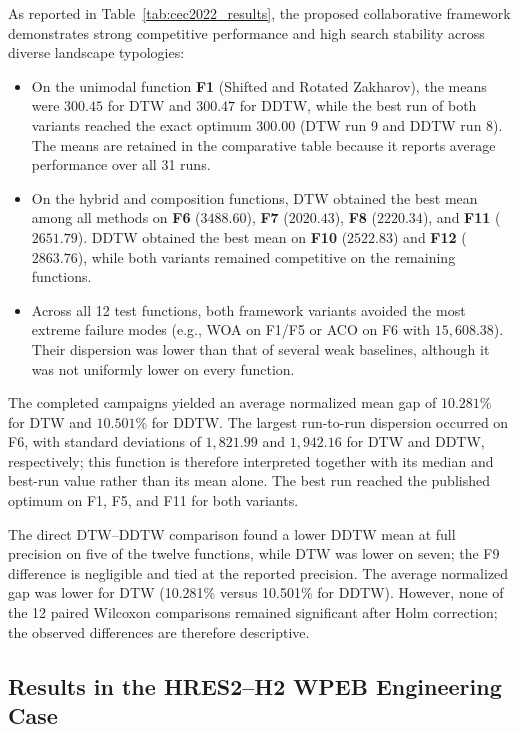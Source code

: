 As reported in Table~\ref{tab:cec2022_results}, the proposed collaborative framework demonstrates strong competitive performance and high search stability across diverse landscape typologies:
\begin{itemize}
    \item On the unimodal function \textbf{F1} (Shifted and Rotated Zakharov), the means were $300.45$ for DTW and $300.47$ for DDTW, while the best run of both variants reached the exact optimum $300.00$ (DTW run 9 and DDTW run 8). The means are retained in the comparative table because it reports average performance over all 31 runs.
    \item On the hybrid and composition functions, DTW obtained the best mean among all methods on \textbf{F6} ($3488.60$), \textbf{F7} ($2020.43$), \textbf{F8} ($2220.34$), and \textbf{F11} ($2651.79$). DDTW obtained the best mean on \textbf{F10} ($2522.83$) and \textbf{F12} ($2863.76$), while both variants remained competitive on the remaining functions.
    \item Across all 12 test functions, both framework variants avoided the most extreme failure modes (e.g., WOA on F1/F5 or ACO on F6 with $15{,}608.38$). Their dispersion was lower than that of several weak baselines, although it was not uniformly lower on every function.
\end{itemize}

The completed campaigns yielded an average normalized mean gap of $10.281\%$
for DTW and $10.501\%$ for DDTW. The largest run-to-run dispersion occurred
on F6, with standard deviations of $1{,}821.99$ and $1{,}942.16$ for DTW and
DDTW, respectively; this function is therefore interpreted together with its
median and best-run value rather than its mean alone. The best run reached the
published optimum on F1, F5, and F11 for both variants.

The direct DTW--DDTW comparison found a lower DDTW mean at full precision on
five of the twelve functions, while DTW was lower on seven; the F9 difference
is negligible and tied at the reported precision. The average normalized gap was lower for DTW (10.281\% versus
10.501\% for DDTW). However, none of the 12 paired Wilcoxon comparisons remained
significant after Holm correction; the observed differences are therefore
descriptive.






\subsection{Results in the HRES2--H2 WPEB Engineering Case}
\label{sec:results_hres2}

